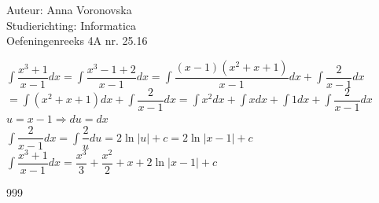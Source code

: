 \documentclass[a4paper]{article}
\begin{document}
  
\noindent \large Auteur: Anna Voronovska \\
\noindent \large Studierichting: Informatica\\
\noindent \large Oefeningenreeks 4A nr. 25.16\\

\medskip

\normalsize
$ \displaystyle\int \dfrac{x^3 + 1}{x - 1}dx  = \displaystyle\int \dfrac{x^3 - 1 + 2}{x - 1}dx = \displaystyle\int \dfrac{(x-1)(x^2 + x + 1)}{x-1}dx +  \displaystyle\int \dfrac{2}{x-1}dx$\\

$=\displaystyle\int (x^2 + x + 1)dx +  \displaystyle\int \dfrac{2}{x-1}dx =  \displaystyle\int x^2dx +  \displaystyle\int  xdx +  \displaystyle\int 1dx + \displaystyle\int \dfrac{2}{x-1}dx$\\

$u = x - 1 \Rightarrow du = dx$\\

$\displaystyle\int \dfrac{2}{x-1}dx  = \displaystyle\int \dfrac{2}{u}du = 2 \ln|u| +c = 2 \ln|x - 1| +c $\\

$ \displaystyle\int \dfrac{x^3 + 1}{x - 1}dx = \dfrac{x^3}{3} + \dfrac{x^2}{2} + x + 2 \ln|x - 1| + c $\\

\begin{thebibliography}{999}
\end{thebibliography}
\end{document}
